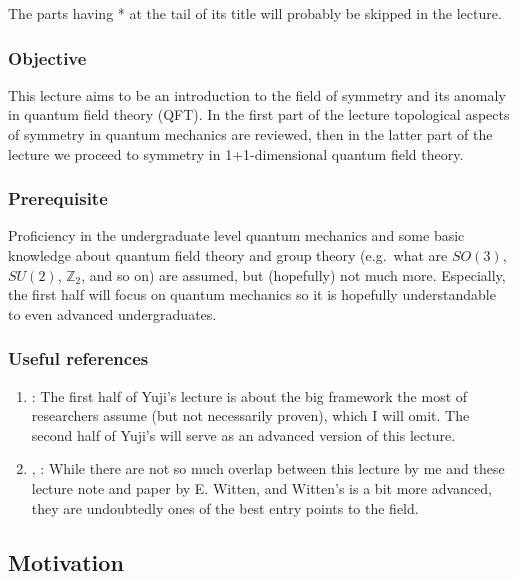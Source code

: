 \documentclass[
]{scrartcl}
\providecommand{\tightlist}{%
  \setlength{\itemsep}{0pt}\setlength{\parskip}{0pt}}
\numberwithin{equation}{section}
\theoremstyle{definition}
\theoremstyle{definition}
\theoremstyle{definition}
\theoremstyle{definition}
\theoremstyle{remark}
\begin{document}
The parts having * at the tail of its title will probably be skipped in the lecture.

\hypertarget{objective}{%
\subsubsection{Objective}\label{objective}}

This lecture aims to be an introduction to the field of symmetry and its anomaly in quantum field theory (QFT). In the first part of the lecture topological aspects of symmetry in quantum mechanics are reviewed, then in the latter part of the lecture we proceed to symmetry in 1+1-dimensional quantum field theory.

\hypertarget{prerequisite}{%
\subsubsection{Prerequisite}\label{prerequisite}}

Proficiency in the undergraduate level quantum mechanics and some basic knowledge about quantum field theory and group theory (e.g.~what are \(SO(3)\), \(SU(2)\), \(\mathbb{Z}_2\), and so on) are assumed, but (hopefully) not much more. Especially, the first half will focus on quantum mechanics so it is hopefully understandable to even advanced undergraduates.

\hypertarget{useful-references}{%
\subsubsection{Useful references}\label{useful-references}}

\begin{enumerate}
\def\labelenumi{\arabic{enumi}.}
\tightlist
\item
  \textcite{tachikawa_2019}:
  The first half of Yuji's lecture is about the big framework the most of researchers assume (but not necessarily proven), which I will omit.
  The second half of Yuji's will serve as an advanced version of this lecture.
\item
  \textcite{Witten:2015aoa}, \textcite{Witten:2015aba}:
  While there are not so much overlap between this lecture by me and these lecture note and paper by E. Witten, and Witten's is a bit more advanced, they are undoubtedly ones of the best entry points to the field.
\end{enumerate}

\hypertarget{motivation}{%
\subsection{Motivation}\label{motivation}}
\end{document}
